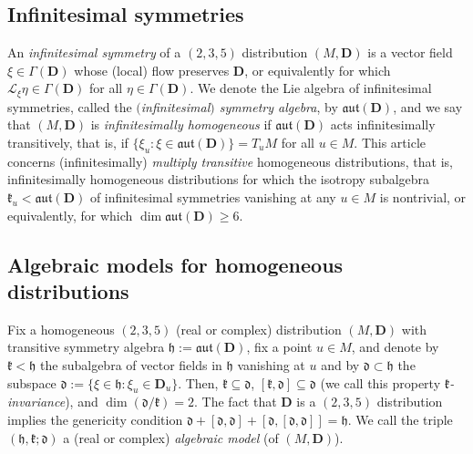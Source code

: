 \documentclass[10pt,a4paper]{amsart}
\newcommand{\mbD}{\mathbf{D}}
\newcommand{\mcL}{\mathcal{L}}
\newcommand{\mfd} {\mathfrak{d}}
\newcommand{\mfh} {\mathfrak{h}}
\newcommand{\mfk} {\mathfrak{k}}
\newcommand{\mfaut}{\mathfrak{aut}}
\numberwithin{equation}{section}
\begin{document}
\subsection{Infinitesimal symmetries} An \textit{infinitesimal symmetry} of a $(2, 3, 5)$ distribution $(M, \mbD)$ is a vector field $\xi \in \Gamma(\mbD)$ 	whose (local) flow preserves $\mbD$, or equivalently for which $\mcL_{\xi} \eta \in \Gamma(\mbD)$ for all $\eta \in \Gamma(\mbD)$. We denote the Lie algebra of infinitesimal symmetries, called the \textit{$($infinitesimal$)$ symmetry algebra}, by $\mfaut(\mbD)$, and we say that $(M, \mbD)$ is \textit{infinitesimally homogeneous} if $\mfaut(\mbD)$ acts infinitesimally transitively, that is, if $\{\xi_u \colon \xi \in \mfaut(\mbD)\} = T_u M$ for all $u \in M$. This article concerns (infinitesimally) \textit{multiply transitive} homogeneous distributions, that is, infinitesimally homogeneous distributions for which the isotropy subalgebra $\mfk_u < \mfaut(\mbD)$ of infinitesimal symmetries vanishing at any $u \in M$ is nontrivial, or equivalently, for which $\dim \mfaut(\mbD) \geq 6$.

\subsection{Algebraic models for homogeneous distributions}

Fix a homogeneous $(2, 3, 5)$ (real or complex) distribution $(M, \mbD)$ with transitive symmetry algebra $\mfh := \mfaut(\mbD)$, fix a point $u \in M$, and denote by $\mfk < \mfh$ the subalgebra of vector fields in $\mfh$ vanishing at $u$ and by $\mfd \subset \mfh$ the subspace $\mfd := \{\xi \in \mfh \colon \xi_u \in \mbD_u\}$. Then, $\mfk \subseteq \mfd$, $[\mfk, \mfd] \subseteq \mfd$ (we call this property \textit{$\mfk$-invariance}), and $\dim(\mfd / \mfk) = 2$. The fact that $\mbD$ is a $(2, 3, 5)$ distribution implies the genericity condition $\mfd + [\mfd, \mfd] + [\mfd, [\mfd, \mfd]] = \mfh$. We call the triple $(\mfh, \mfk; \mfd)$ a (real or complex) \textit{algebraic model} (of $(M, \mbD)$).
\end{document}
